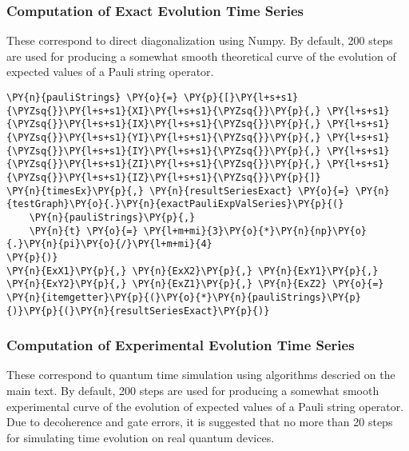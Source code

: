     \hypertarget{computation-of-exact-evolution-time-series}{%
\subsubsection{Computation of Exact Evolution Time
Series}\label{computation-of-exact-evolution-time-series}}

These correspond to direct diagonalization using Numpy. By default, 200
steps are used for producing a somewhat smooth theoretical curve of the
evolution of expected values of a Pauli string operator.

    \begin{tcolorbox}[breakable, size=fbox, boxrule=1pt, pad at break*=1mm,colback=cellbackground, colframe=cellborder]
\begin{Verbatim}[commandchars=\\\{\}]
\PY{n}{pauliStrings} \PY{o}{=} \PY{p}{[}\PY{l+s+s1}{\PYZsq{}}\PY{l+s+s1}{XI}\PY{l+s+s1}{\PYZsq{}}\PY{p}{,} \PY{l+s+s1}{\PYZsq{}}\PY{l+s+s1}{IX}\PY{l+s+s1}{\PYZsq{}}\PY{p}{,} \PY{l+s+s1}{\PYZsq{}}\PY{l+s+s1}{YI}\PY{l+s+s1}{\PYZsq{}}\PY{p}{,} \PY{l+s+s1}{\PYZsq{}}\PY{l+s+s1}{IY}\PY{l+s+s1}{\PYZsq{}}\PY{p}{,} \PY{l+s+s1}{\PYZsq{}}\PY{l+s+s1}{ZI}\PY{l+s+s1}{\PYZsq{}}\PY{p}{,} \PY{l+s+s1}{\PYZsq{}}\PY{l+s+s1}{IZ}\PY{l+s+s1}{\PYZsq{}}\PY{p}{]}
\PY{n}{timesEx}\PY{p}{,} \PY{n}{resultSeriesExact} \PY{o}{=} \PY{n}{testGraph}\PY{o}{.}\PY{n}{exactPauliExpValSeries}\PY{p}{(}
    \PY{n}{pauliStrings}\PY{p}{,}
    \PY{n}{t} \PY{o}{=} \PY{l+m+mi}{3}\PY{o}{*}\PY{n}{np}\PY{o}{.}\PY{n}{pi}\PY{o}{/}\PY{l+m+mi}{4}
\PY{p}{)}
\PY{n}{ExX1}\PY{p}{,} \PY{n}{ExX2}\PY{p}{,} \PY{n}{ExY1}\PY{p}{,} \PY{n}{ExY2}\PY{p}{,} \PY{n}{ExZ1}\PY{p}{,} \PY{n}{ExZ2} \PY{o}{=} \PY{n}{itemgetter}\PY{p}{(}\PY{o}{*}\PY{n}{pauliStrings}\PY{p}{)}\PY{p}{(}\PY{n}{resultSeriesExact}\PY{p}{)}
\end{Verbatim}
\end{tcolorbox}

    \hypertarget{computation-of-experimental-evolution-time-series}{%
\subsubsection{Computation of Experimental Evolution Time
Series}\label{computation-of-experimental-evolution-time-series}}

These correspond to quantum time simulation using algorithms descried on
the main text. By default, 200 steps are used for producing a somewhat
smooth experimental curve of the evolution of expected values of a Pauli
string operator. Due to decoherence and gate errors, it is suggested
that no more than 20 steps for simulating time evolution on real quantum
devices.

